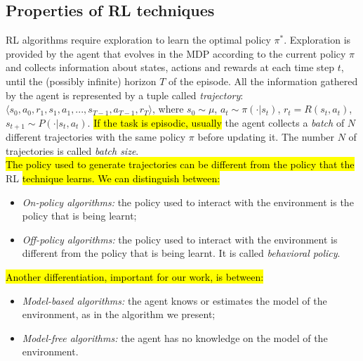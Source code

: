 \subsection{Properties of \ac{RL} techniques}
\ac{RL} algorithms require exploration to learn the optimal policy $\pi^{*}$. Exploration is provided by the agent that evolves in the \ac{MDP} according to the current policy $\pi$ and collects information about states, actions and rewards at each time step $t$, until the (possibly infinite) horizon $T$ of the episode. All the information gathered by the agent is represented by a tuple called \emph{trajectory}: $\langle s_0, a_0, r_1, s_1, a_1, ..., s_{T-1}, a_{T-1}, r_{T} \rangle$, where $s_{0} \sim \mu$, $a_{t} \sim \pi(\cdot|s_{t})$, $r_{t} = R(s_{t}, a_{t})$, $s_{t+1} \sim P(\cdot|s_{t}, a_{t})$. \hl{If the task is episodic, usually} the agent collects a \emph{batch} of $N$ different trajectories with the same policy $\pi$ before updating it. The number $N$ of trajectories is called \emph{batch size}.\\
\newline
\hl{The policy used to generate trajectories can be different from the policy that the }\ac{RL}\hl{ technique learns. We can distinguish between:}
\begin{itemize}
	\item \emph{On-policy algorithms:} the policy used to interact with the environment is the policy that is being learnt;
	\item \emph{Off-policy algorithms:} the policy used to interact with the environment is different from the policy that is being learnt. It is called \emph{behavioral policy}.
\end{itemize}
\hl{Another differentiation, important for our work, is between:}
\begin{itemize}
	\item \emph{Model-based algorithms:} the agent knows or estimates the model of the environment, as in the algorithm we present;
	\item \emph{Model-free algorithms:} the agent has no knowledge on the model of the environment.
\end{itemize}

